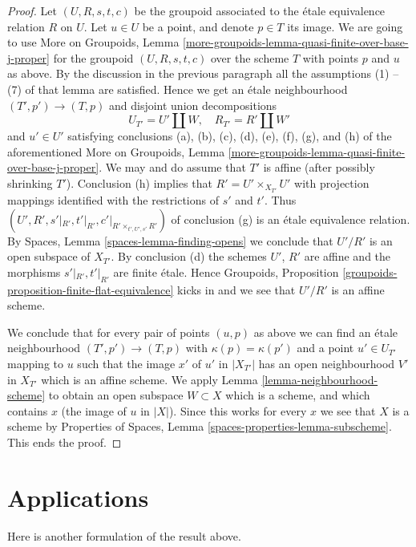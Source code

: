 \begin{proof}
\medskip\noindent
Let $(U, R, s, t, c)$ be the groupoid associated to the \'etale
equivalence relation $R$ on $U$. Let $u \in U$ be a point, and
denote $p \in T$ its image. We are going to use
More on Groupoids,
Lemma \ref{more-groupoids-lemma-quasi-finite-over-base-j-proper}
for the groupoid $(U, R, s, t, c)$ over the scheme $T$ with
points $p$ and $u$ as above.
By the discussion in the previous paragraph all the
assumptions (1) -- (7) of that lemma are satisfied.
Hence we get an \'etale neighbourhood
$(T', p') \to (T, p)$ and disjoint union decompositions
$$
U_{T'} = U' \amalg W, \quad
R_{T'} = R' \amalg W'
$$
and $u' \in U'$ satisfying conclusions
(a), (b), (c), (d), (e), (f), (g), and (h) of the aforementioned
More on Groupoids,
Lemma \ref{more-groupoids-lemma-quasi-finite-over-base-j-proper}.
We may and do assume that $T'$ is affine (after possibly shrinking $T'$).
Conclusion (h) implies that $R' = U' \times_{X_{T'}} U'$ with projection
mappings identified with the restrictions of $s'$ and $t'$.
Thus $(U', R', s'|_{R'}, t'|_{R'}, c'|_{R' \times_{t', U', s'} R'})$ of
conclusion (g) is an \'etale equivalence relation. By
Spaces, Lemma \ref{spaces-lemma-finding-opens}
we conclude that $U'/R'$ is an open subspace of $X_{T'}$. By conclusion (d)
the schemes $U'$, $R'$ are affine and the morphisms
$s'|_{R'}, t'|_{R'}$ are finite \'etale. Hence
Groupoids, Proposition \ref{groupoids-proposition-finite-flat-equivalence}
kicks in and we see that $U'/R'$ is an affine scheme.

\medskip\noindent
We conclude that for every pair of points $(u, p)$ as above we can
find an \'etale neighbourhood $(T', p') \to (T, p)$ with
$\kappa(p) = \kappa(p')$ and a point $u' \in U_{T'}$ mapping to $u$
such that the image $x'$ of $u'$ in $|X_{T'}|$ has an open neighbourhood
$V'$ in $X_{T'}$ which is an affine scheme. We apply
Lemma \ref{lemma-neighbourhood-scheme}
to obtain an open subspace $W \subset X$ which is a scheme, and
which contains $x$ (the image of $u$ in $|X|$).
Since this works for every $x$ we see that $X$
is a scheme by
Properties of Spaces, Lemma \ref{spaces-properties-lemma-subscheme}.
This ends the proof.
\end{proof}



\section{Applications}
\label{section-applications}

\noindent
Here is another formulation of the result above.


